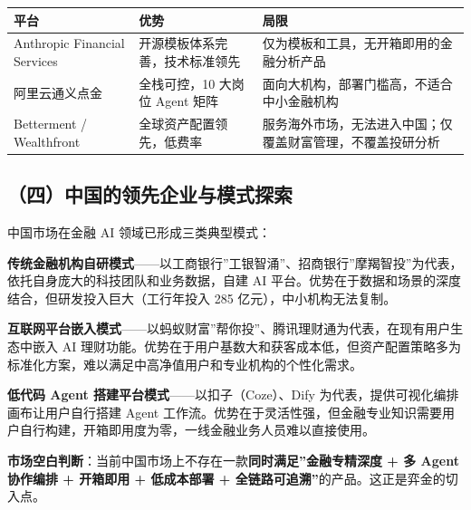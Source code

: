 \documentclass[
]{ctexart}
\begin{document}
\begin{longtable}[]{@{}
  >{\raggedright\arraybackslash}p{}
  >{\raggedright\arraybackslash}p{}
  >{\raggedright\arraybackslash}p{}@{}}
\toprule\noalign{}
\begin{minipage}[b]{\linewidth}\raggedright
平台
\end{minipage} & \begin{minipage}[b]{\linewidth}\raggedright
优势
\end{minipage} & \begin{minipage}[b]{\linewidth}\raggedright
局限
\end{minipage} \\
\midrule\noalign{}
\endhead
\bottomrule\noalign{}
\endlastfoot
Anthropic Financial Services & 开源模板体系完善，技术标准领先 &
仅为模板和工具，无开箱即用的金融分析产品 \\
阿里云通义点金 & 全栈可控，10 大岗位 Agent 矩阵 &
面向大机构，部署门槛高，不适合中小金融机构 \\
Betterment / Wealthfront & 全球资产配置领先，低费率 &
服务海外市场，无法进入中国；仅覆盖财富管理，不覆盖投研分析 \\
\end{longtable}


\subsection{（四）中国的领先企业与模式探索}\label{ux56dbux4e2dux56fdux7684ux9886ux5148ux4f01ux4e1aux4e0eux6a21ux5f0fux63a2ux7d22}

中国市场在金融 AI 领域已形成三类典型模式：

\textbf{传统金融机构自研模式}------以工商银行''工银智涌''、招商银行''摩羯智投''为代表，依托自身庞大的科技团队和业务数据，自建
AI 平台。优势在于数据和场景的深度结合，但研发投入巨大（工行年投入 285
亿元），中小机构无法复制。

\textbf{互联网平台嵌入模式}------以蚂蚁财富''帮你投''、腾讯理财通为代表，在现有用户生态中嵌入
AI
理财功能。优势在于用户基数大和获客成本低，但资产配置策略多为标准化方案，难以满足中高净值用户和专业机构的个性化需求。

\textbf{低代码 Agent 搭建平台模式}------以扣子（Coze）、Dify
为代表，提供可视化编排画布让用户自行搭建 Agent
工作流。优势在于灵活性强，但金融专业知识需要用户自行构建，开箱即用度为零，一线金融业务人员难以直接使用。

\textbf{市场空白判断}：当前中国市场上不存在一款\textbf{同时满足''金融专精深度
+ 多 Agent 协作编排 + 开箱即用 + 低成本部署 +
全链路可追溯''}的产品。这正是弈金的切入点。
\end{document}
